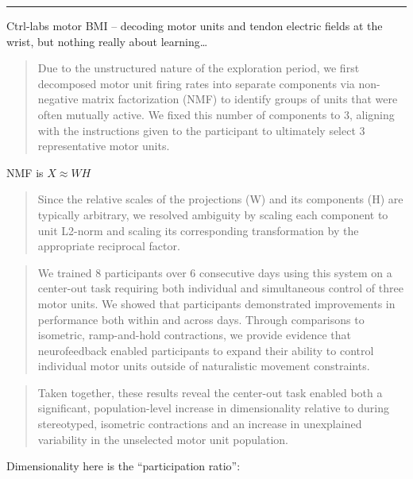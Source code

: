 \documentclass[../main.tex]{subfiles}
\begin{document}
\begin{center}\rule{0.5\linewidth}{0.5pt}\end{center}

Ctrl-labs motor BMI \cite{@mendezguerraNoninvasiveRealtimeAccess2021} -- decoding motor units and tendon electric fields at the wrist, but nothing really about learning\ldots{}

\begin{quote}
Due to the unstructured nature of the exploration period, we first decomposed motor unit firing rates into separate components via non-negative matrix factorization (NMF) to identify groups of units that were often mutually active. We fixed this number of components to 3, aligning with the instructions given to the participant to ultimately select 3 representative motor units. \cite{@formentoNoninvasiveBrainmachineInterface2021}
\end{quote}

NMF is $X \approx WH$

\begin{quote}
Since the relative scales of the projections (W) and its components (H) are typically arbitrary, we resolved ambiguity by scaling each component to unit L2-norm and scaling its corresponding transformation by the appropriate reciprocal factor.
\end{quote}

\begin{quote}
We trained 8 participants over 6 consecutive days using this system on a center-out task requiring both individual and simultaneous control of three motor units. We showed that participants demonstrated improvements in performance both within and across days. Through comparisons to isometric, ramp-and-hold contractions, we provide evidence that neurofeedback enabled participants to expand their ability to control individual motor units outside of naturalistic movement constraints.
\end{quote}

\begin{quote}
Taken together, these results reveal the center-out task enabled both a significant, population-level increase in dimensionality relative to during stereotyped, isometric contractions and an increase in unexplained variability in the unselected motor unit population. \cite{@formentoNoninvasiveBrainmachineInterface2021}
\end{quote}

Dimensionality here is the ``participation ratio'':
\end{document}
